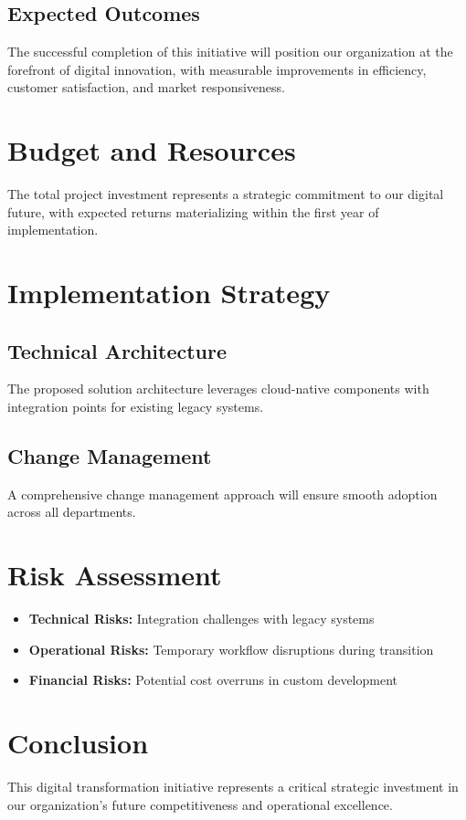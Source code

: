\documentclass[11pt,a4paper]{article}
\begin{document}
\subsection{Expected Outcomes}

The successful completion of this initiative will position our organization at the forefront of digital innovation, with measurable improvements in efficiency, customer satisfaction, and market responsiveness.

\lipsum[1]

\section{Budget and Resources}

The total project investment represents a strategic commitment to our digital future, with expected returns materializing within the first year of implementation.

\lipsum[2]

\section{Implementation Strategy}

\subsection{Technical Architecture}

The proposed solution architecture leverages cloud-native components with integration points for existing legacy systems.

\lipsum[3]

\subsection{Change Management}

A comprehensive change management approach will ensure smooth adoption across all departments.

\lipsum[4]

\section{Risk Assessment}

\begin{itemize}
  \item \textbf{Technical Risks:} Integration challenges with legacy systems
  \item \textbf{Operational Risks:} Temporary workflow disruptions during transition
  \item \textbf{Financial Risks:} Potential cost overruns in custom development
\end{itemize}

\lipsum[5-6]

\section{Conclusion}

This digital transformation initiative represents a critical strategic investment in our organization's future competitiveness and operational excellence.

\lipsum[7]
\end{document}
